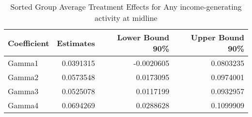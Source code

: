\begin{table}

\caption{\label{tab:gatesRany_iga}Sorted Group Average Treatment Effects for Any income-generating activity at midline}
\centering
\begin{tabular}[t]{lrrr}
\toprule
Coefficient & Estimates & Lower Bound 90\% & Upper Bound 90\%\\
\midrule
Gamma1 & 0.0391315 & -0.0020605 & 0.0803235\\
Gamma2 & 0.0573548 & 0.0173095 & 0.0974001\\
Gamma3 & 0.0525078 & 0.0117199 & 0.0932957\\
Gamma4 & 0.0694269 & 0.0288628 & 0.1099909\\
\bottomrule
\end{tabular}
\end{table}
